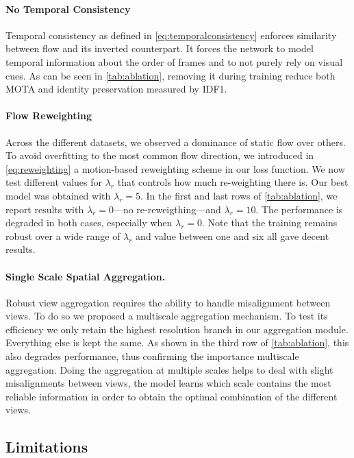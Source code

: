 \documentclass[10pt,twocolumn,letterpaper]{article}
\begin{document}
\paragraph*{No Temporal Consistency}
Temporal consistency as defined in \cref{eq:temporalconsistency} enforces similarity between flow and its inverted counterpart. It forces the network to model temporal information about the order of frames and to not purely rely on visual cues. As can be seen in \cref{tab:ablation}, removing it during training reduce both MOTA and identity preservation measured by IDF1. 

\paragraph*{Flow Reweighting}

Across the different datasets, we observed a dominance of static flow over others. To avoid overfitting to the most common flow direction, we introduced in \cref{eq:reweighting} a motion-based reweighting scheme in our loss function. We now test different values for $\lambda_r$ that controls how much  re-weighting there is. Our best model was obtained with $\lambda_r=5$. In the first and last rows of \cref{tab:ablation}, we report results with  $\lambda_r=0$---no re-reweigthing---and $\lambda_r=10$. The performance is degraded in both cases, especially when  $\lambda_r=0$. Note that the training remains robust over a wide range of $\lambda_r$ and value between one and six all gave decent results.

\paragraph*{Single Scale Spatial Aggregation.}

Robust view aggregation requires the ability to handle misalignment between views. To do so we proposed a multiscale aggregation mechanism. To test its efficiency we only retain the highest resolution branch in our aggregation module. Everything else is kept the same. As shown in the third row of \cref{tab:ablation}, this also degrades performance, thus confirming the importance  multiscale aggregation. Doing the aggregation at multiple scales helps to deal with slight misalignments between views, the model learns which scale contains the most reliable information in order to obtain the optimal combination of the different views.


 \subsection{Limitations}
\end{document}
